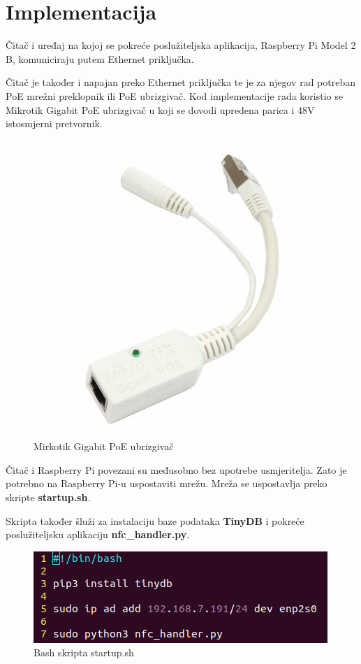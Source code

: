 \documentclass[times, utf8, zavrsni]{fer}
\begin{document}
\newpage

\section{Implementacija}
Čitač i uređaj na kojoj se pokreće poslužiteljska aplikacija, Raspberry Pi Model 2 B, komuniciraju putem Ethernet priključka.\par 
Čitač je također i napajan preko Ethernet priključka te je za njegov rad potreban PoE mrežni preklopnik ili PoE ubrizgivač. Kod implementacije rada koristio se Mikrotik Gigabit PoE ubrizgivač u koji se dovodi upredena parica i 48V istosmjerni pretvornik. 

\begin{figure}[h]
\includegraphics[scale=0.3]{poe.jpg}
\centering
\caption{Mirkotik Gigabit PoE ubrizgivač}
\centering
\end{figure}

Čitač i Raspberry Pi povezani su međusobno bez upotrebe usmjeritelja. Zato je potrebno na Raspberry Pi-u uspostaviti mrežu. Mreža se uspostavlja preko skripte \textbf{startup.sh}.\par 
Skripta također šluži za instalaciju baze podataka \textbf{TinyDB} i pokreće poslužiteljsku aplikaciju \textbf{nfc\_handler.py}.

\begin{figure}[h]
\includegraphics[scale=0.6]{skripta.png}
\centering
\caption{Bash skripta startup.sh}
\centering
\end{figure}
\end{document}
